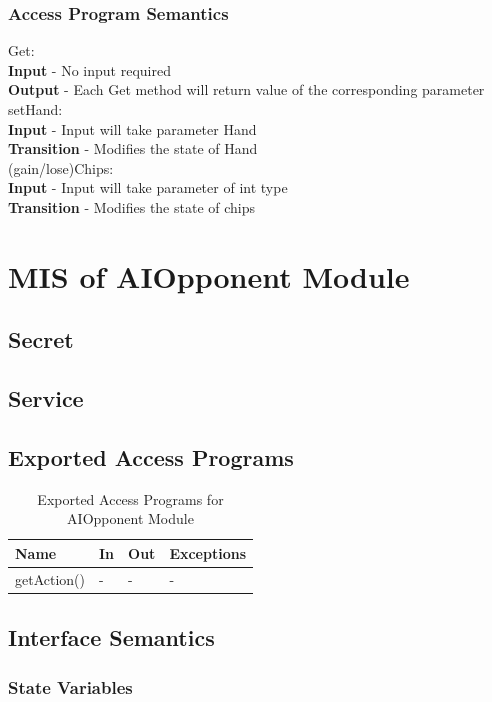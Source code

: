 \documentclass[11pt]{article}
\begin{document}
    \subsubsection{Access Program Semantics}
    Get:\\
    \textbf{Input} - No input required\\
    \textbf{Output} - Each Get method will return value of the corresponding parameter\\
    setHand:\\
   	\textbf{Input} - Input will take parameter Hand\\
   	\textbf{Transition} - Modifies the state of Hand\\
   	(gain/lose)Chips:\\
   	\textbf{Input} - Input will take parameter of int type\\
   	\textbf{Transition} - Modifies the state of chips
 	\newline
 	\section{MIS of AIOpponent Module}
     \subsection{Secret}
    \subsection{Service}
    \subsection{Exported Access Programs}
    \begin{table}[h]
    \caption{Exported Access Programs for AIOpponent Module}
    \begin{tabular}{p{4cm}p{2cm}p{2cm}p{4cm}}
    Name & In & Out & Exceptions\\
    \hline
    getAction() & - & - & -\\
    \hline
    \end{tabular}
    \end{table}
    \subsection{Interface Semantics}
    \subsubsection{State Variables}
\end{document}
